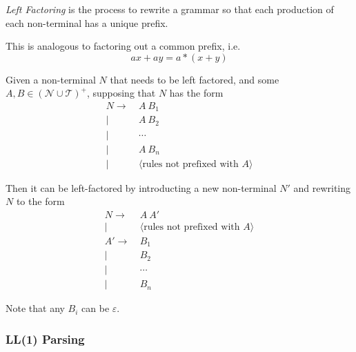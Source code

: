 \begin{definition}
    \textit{Left Factoring} is the process to rewrite a grammar so that each production of each non-terminal has a unique prefix.
    
    This is analogous to factoring out a common prefix, i.e.
    \begin{equation}
        ax + ay = a * (x + y)
    \end{equation}
    
    Given a non-terminal $N$ that needs to be left factored, and some $A, B \in (\mathcal{N} \cup \mathcal{T})^+$, supposing that $N$ has the form
    \begin{equation}
        \begin{aligned}
            N \to  &\ A\ B_1 \\
              \mid &\ A\ B_2 \\
              \mid &\ \cdots \\
              \mid &\ A\ B_n \\
              \mid &\ \langle \text{rules not prefixed with\ } A \rangle
        \end{aligned}
    \end{equation}
    
    Then it can be left-factored by introducting a new non-terminal $N\prime$ and rewriting $N$ to the form
    \begin{equation}
        \begin{aligned}
            N \to  &\ A\ A\prime \\
              \mid &\ \langle \text{rules not prefixed with\ } A \rangle \\
            A\prime \to  &\ B_1 \\
                    \mid &\ B_2 \\
                    \mid &\ \cdots \\
                    \mid &\ B_n
        \end{aligned}
    \end{equation}
    
    Note that any $B_i$ can be $\varepsilon$.
\end{definition}

\subsubsection{LL(1) Parsing}

